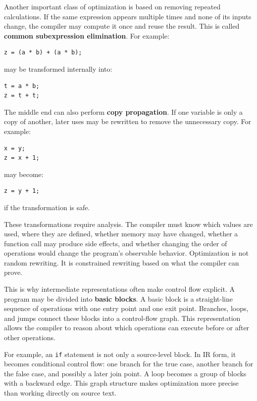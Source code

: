 Another important class of optimization is based on removing repeated calculations. If the same expression appears multiple times and none of its inputs change, the compiler may compute it once and reuse the result. This is called \textbf{common subexpression elimination}. For example:

\begin{verbatim}
z = (a * b) + (a * b);
\end{verbatim}

may be transformed internally into:

\begin{verbatim}
t = a * b;
z = t + t;
\end{verbatim}

The middle end can also perform \textbf{copy propagation}. If one variable is only a copy of another, later uses may be rewritten to remove the unnecessary copy. For example:

\begin{verbatim}
x = y;
z = x + 1;
\end{verbatim}

may become:

\begin{verbatim}
z = y + 1;
\end{verbatim}

if the transformation is safe.

These transformations require analysis. The compiler must know which values are used, where they are defined, whether memory may have changed, whether a function call may produce side effects, and whether changing the order of operations would change the program's observable behavior. Optimization is not random rewriting. It is constrained rewriting based on what the compiler can prove.

This is why intermediate representations often make control flow explicit. A program may be divided into \textbf{basic blocks}. A basic block is a straight-line sequence of operations with one entry point and one exit point. Branches, loops, and jumps connect these blocks into a control-flow graph. This representation allows the compiler to reason about which operations can execute before or after other operations.

For example, an \texttt{if} statement is not only a source-level block. In IR form, it becomes conditional control flow: one branch for the true case, another branch for the false case, and possibly a later join point. A loop becomes a group of blocks with a backward edge. This graph structure makes optimization more precise than working directly on source text.

